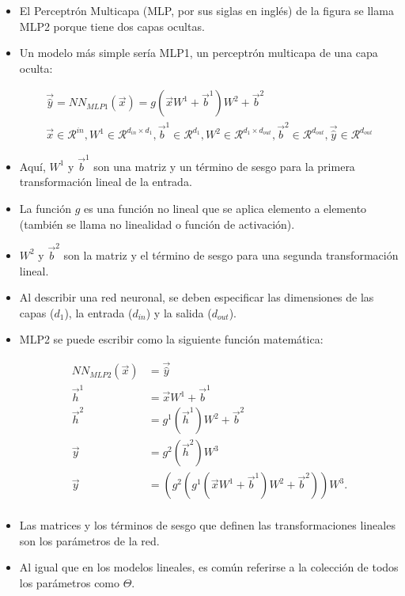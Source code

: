 \begin{itemize}
\item El Perceptrón Multicapa (MLP, por sus siglas en inglés) de la figura se llama MLP2 porque tiene dos capas ocultas.
\item Un modelo más simple sería MLP1, un perceptrón multicapa de una capa oculta:
\begin{center}
\begin{equation}
\begin{split}
\vec{\hat{y}} = NN_{MLP1}(\vec{x}) = g(\vec{x}W^{1}+\vec{b}^{1})W^{2}+\vec{b}^{2} \\
\vec{x} \in \mathcal{R}^{in}, W^{1} \in \mathcal{R}^{d_{in}\times d_{1}}, \vec{b}^{1} \in \mathcal{R}^{d_{1}}, W^{2} \in \mathcal{R}^{d_{1}\times d_{out}}, \vec{b}^{2} \in \mathcal{R}^{d_{out}}, \vec{\hat{y}} \in \mathcal{R}^{d_{out}}
\end{split}
\end{equation}
\end{center}

\item Aquí, $W^{1}$ y $\vec{b}^{1}$ son una matriz y un término de sesgo para la primera transformación lineal de la entrada.
\item La función $g$ es una función no lineal que se aplica elemento a elemento (también se llama no linealidad o función de activación).
\item $W^{2}$ y $\vec{b}^{2}$ son la matriz y el término de sesgo para una segunda transformación lineal.

\item Al describir una red neuronal, se deben especificar las dimensiones de las capas ($d_{1}$), la entrada ($d_{in}$) y la salida ($d_{out}$).
\item MLP2 se puede escribir como la siguiente función matemática:
\begin{center}
\begin{equation}
\begin{split}
NN_{MLP2}(\vec{x}) & =  \vec{\hat{y}}  \\
\vec{h}^{1} &  = \vec{x}W^{1}+\vec{b}^{1} \\
\vec{h}^{2} &  = g^{1}(\vec{h}^{1})W^{2}+\vec{b}^{2} \\
\vec{y} &  = g^{2}(\vec{h}^{2})W^{3}\\
\vec{y} &  = (g^2(g^1(\vec{x}W^{1}+\vec{b}^{1})W^2+\vec{b}^2))W^3.\\
\end{split}
\end{equation}
\end{center}
\item Las matrices y los términos de sesgo que definen las transformaciones lineales son los parámetros de la red.
\item Al igual que en los modelos lineales, es común referirse a la colección de todos los parámetros como $\Theta$.
\end{itemize}

